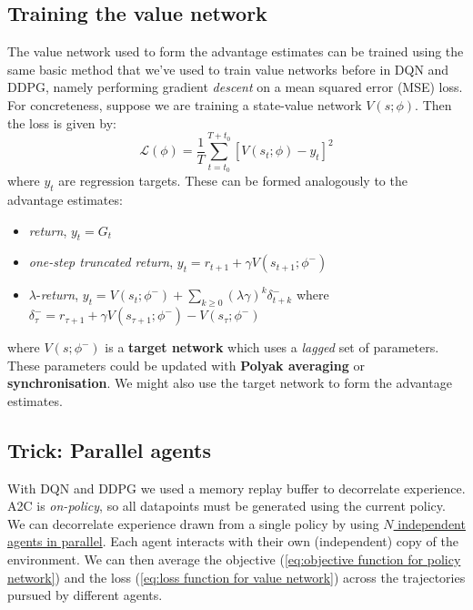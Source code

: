 \documentclass[]{article}
\begin{document}
\subsection*{Training the value network}

The value network used to form the advantage estimates can be trained using the same basic method that we've used to train value networks before in DQN and DDPG, namely performing gradient \emph{descent} on a mean squared error (MSE) loss. For concreteness, suppose we are training a state-value network $V(s;\phi)$. Then the loss is given by:
\begin{equation}\label{eq:loss function for value network}
	\mathcal{L}(\phi) = \frac{1}{T} \sum_{t=t_0}^{T+t_0} [ V(s_t;\phi) - y_t ]^2
\end{equation}
where $y_t$ are regression targets. These can be formed analogously to the advantage estimates:
\begin{itemize}
	\item \emph{return}, $y_t = G_t$
	\item \emph{one-step truncated return}, $y_t = r_{t+1} + \gamma V(s_{t+1};\phi^-)$
	\item $\lambda$-\emph{return}, $y_t = V(s_t;\phi^-) + \sum_{k\geq 0} (\lambda \gamma)^k \delta^-_{t+k}$ where $ \delta^-_{\tau} = r_{\tau+1} + \gamma V(s_{\tau+1};\phi^-) - V(s_{\tau};\phi^-)$
\end{itemize} 
where $V(s;\phi^-)$ is a \textbf{target network} which uses a \emph{lagged} set of parameters. These parameters could be updated with \textbf{Polyak averaging} or \textbf{synchronisation}. We might also use the target network to form the advantage estimates. 

\subsection*{Trick: Parallel agents}

With DQN and DDPG we used a memory replay buffer to decorrelate experience. A2C is \emph{on-policy}, so all datapoints must be generated using the current policy. We can decorrelate experience drawn from a single policy by using \ul{$N$ independent agents in parallel}. Each agent interacts with their own (independent) copy of the environment. We can then average the objective (\ref{eq:objective function for policy network}) and the loss (\ref{eq:loss function for value network}) across the trajectories pursued by different agents. 
\end{document}
